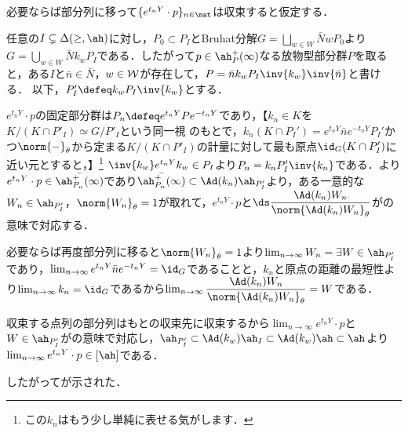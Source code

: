 \begin{pfwn}{}

    必要ならば部分列に移って$\{e^{t_n Y}\cdot p \}_{n\in \nat} $は収束すると仮定する．
  
  任意の$I\subsetneq \Delta(\ge,\ah) $に対し，$P_0\subset P_I $とBruhat分解$G= \bigsqcup_{w\in W}\bar{N}wP_0 $より$G = \bigcup_{w\in W}\bar{N} k_wP_{I} $である．したがって$p \in \ah_{P}^{+} (\infty)$なる放物型部分群$P$を取ると，ある$I$と$\bar{n}\in \bar{N} $，$w\in \cal{W} $が存在して，$P = \bar{n}k_wP_{I}\inv{k_w}\inv{\bar{n}} $と書ける． 以下，$P_{I}'\defeq k_wP_{I}\inv{k_w}$とする．

  $e^{t_n Y}\cdot p $の固定部分群は$P_{n} \defeq e^{t_n Y}Pe^{-t_n Y} $であり，【$k_n\in K $を$K/(K\cap P'_{I})\simeq G/P'_{I} $という同一視 %
  のもとで，$k_n(K\cap P_{I}') = e^{t_n Y}\bar{n}e^{-t_n Y}P_{I}' $かつ$\norm{-}_{\theta} $から定まる$K/(K\cap P'_{I})$の計量に対して最も原点$\id_G(K\cap P'_{I}) $に近い元とすると，】\footnote{この$k_n$はもう少し単純に表せる気がします．} $\inv{k_w}e^{t_n Y}k_w\in P_{I} $より$P_n =  k_nP_{I}'\inv{k_n} $である．より$e^{t_n Y}\cdot p\in \bar{\ah_{P_n}^{+}(\infty)} $であり$\bar{\ah_{P_n}^{+}(\infty)} \subset \Ad(k_n)\ah_{P_{I}'}  $より，ある一意的な$W_n\in \ah_{P_{I}'} $，$\norm{W_n}_{\theta} = 1 $が取れて，$e^{t_n Y}\cdot p $と$\ds\dfrac{\Ad(k_n)W_n}{\norm{\Ad(k_n)W_n}_{\theta}}$がの意味で対応する．

  
  必要ならば再度部分列に移ると$\norm{W_n}_{\theta}=1 $より$\lim_{n\to \infty}W_n = \exists W \in \ah_{P_{I}'} $であり，$\lim_{n\to \infty}e^{t_n Y}\bar{n}e^{-t_n Y} = \id_G$であることと，$k_n$と原点の距離の最短性より$ \lim_{n\to \infty}k_n = \id_G $であるから$\lim_{n\to\infty} \dfrac{\Ad(k_n)W_n}{\norm{\Ad(k_n)W_n}_{\theta}}= W  $である．

  収束する点列の部分列はもとの収束先に収束するから$\lim_{n\to \infty} e^{t_n Y}\cdot p$と$W\in \ah_{P_{I}'}$がの意味で対応し，$\ah_{P_{I}'}\subset \Ad(k_w)\ah_I\subset \Ad(k_w)\ah\subset \ah $より$\lim_{n\to \infty} e^{t_n Y}\cdot p\in [\ah] $である．
  

  したがってが示された．

\end{pfwn}

